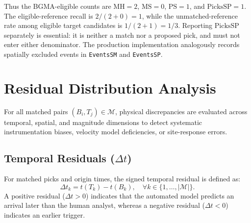 Thus the BGMA-eligible counts are $\mathrm{MH}=2$, $\mathrm{MS}=0$, $\mathrm{PS}=1$, and $\mathrm{PicksSP}=1$. The eligible-reference recall is $2/(2+0)=1$, while the unmatched-reference rate among eligible target candidates is $1/(2+1)=1/3$. Reporting $\mathrm{PicksSP}$ separately is essential: it is neither a match nor a proposed pick, and must not enter either denominator. The production implementation analogously records spatially excluded events in \texttt{EventsSM} and \texttt{EventsSP}.

\section{Residual Distribution Analysis}
\label{sec:residuals}

For all matched pairs $(B_i, T_j) \in \mathcal{M}$, physical discrepancies are evaluated across temporal, spatial, and magnitude dimensions to detect systematic instrumentation biases, velocity model deficiencies, or site-response errors.

\subsection{Temporal Residuals ($\Delta t$)}
For matched picks and origin times, the signed temporal residual is defined as:
\begin{equation}
  \Delta t_k = t(T_k) - t(B_k), \quad \forall k \in \{1, \dots, |\mathcal{M}|\}.
\end{equation}
A positive residual ($\Delta t > 0$) indicates that the automated model predicts an arrival later than the human analyst, whereas a negative residual ($\Delta t < 0$) indicates an earlier trigger.

